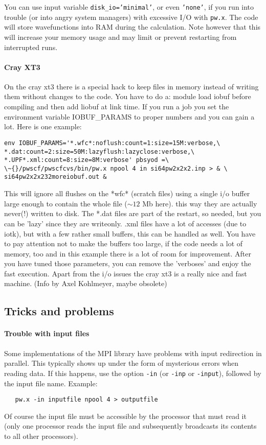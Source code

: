 \documentclass[12pt,a4paper]{article}
\def\pw.x{\texttt{pw.x}}
\begin{document}
You can use input variable \texttt{disk\_io='minimal'}, or even 
\texttt{'none'}, if you run
into trouble (or into angry system managers) with excessive I/O with \pw.x. 
The code will store wavefunctions into RAM during the calculation.
Note however that this will increase your memory usage and may limit 
or prevent restarting from interrupted runs.
\paragraph{Cray XT3}
On the cray xt3 there is a special hack to keep files in
memory instead of writing them without changes to the code.
You have to do a: 
module load iobuf
before compiling and then add liobuf at link time.
If you run a job you set the environment variable 
IOBUF\_PARAMS to proper numbers and you can gain a lot.
Here is one example:
\begin{verbatim}
env IOBUF_PARAMS='*.wfc*:noflush:count=1:size=15M:verbose,\
*.dat:count=2:size=50M:lazyflush:lazyclose:verbose,\
*.UPF*.xml:count=8:size=8M:verbose' pbsyod =\
\~{}/pwscf/pwscfcvs/bin/pw.x npool 4 in si64pw2x2x2.inp > & \
si64pw2x2x232moreiobuf.out &
\end{verbatim}
This will ignore all flushes on the *wfc* (scratch files) using a
single i/o buffer large enough to contain the whole file ($\sim 12$ Mb here).
this way they are actually never(!) written to disk.
The *.dat files are part of the restart, so needed, but you can be
'lazy' since they are writeonly. .xml files have a lot of accesses
(due to iotk), but with a few rather small buffers, this can be
handled as well. You have to pay attention not to make the buffers
too large, if the code needs a lot of memory, too and in this example
there is a lot of room for improvement. After you have tuned those
parameters, you can remove the 'verboses' and enjoy the fast execution.
Apart from the i/o issues the cray xt3 is a really nice and fast machine.
(Info by Axel Kohlmeyer, maybe obsolete)

\subsection{Tricks and problems}

\paragraph{Trouble with input files}
Some implementations of the MPI library have problems with input 
redirection in parallel. This typically shows up under the form of
mysterious errors when reading data. If this happens, use the option 
\texttt{-in} (or \texttt{-inp} or \texttt{-input}), followed by the input file name. 
Example:
\begin{verbatim}
   pw.x -in inputfile npool 4 > outputfile
\end{verbatim} 
Of course the 
input file must be accessible by the processor that must read it
(only one processor reads the input file and subsequently broadcasts
its contents to all other processors).
\end{document}
